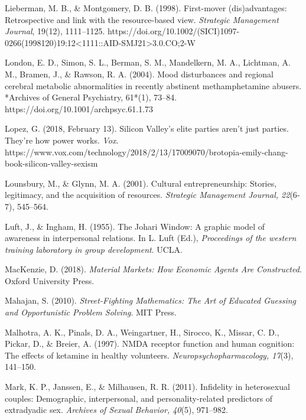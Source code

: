 \begin{thebibliography}{}
    Lieberman, M. B., \& Montgomery, D. B. (1998). First-mover (dis)advantages: Retrospective and link with the resource-based view. \textit{Strategic Management Journal}, 19(12), 1111–1125. https://doi.org/10.1002/(SICI)1097-0266(1998120)19:12<1111::AID-SMJ21>3.0.CO;2-W

    London, E. D., Simon, S. L., Berman, S. M., Mandelkern, M. A., Lichtman, A. M., Bramen, J., \& Rawson, R. A. (2004). Mood disturbances and regional cerebral metabolic abnormalities in recently abstinent methamphetamine abusers. *Archives of General Psychiatry, 61*(1), 73–84. https://doi.org/10.1001/archpsyc.61.1.73

    Lopez, G. (2018, February 13). Silicon Valley’s elite parties aren’t just parties. They’re how power works. \textit{Vox}. https://www.vox.com/technology/2018/2/13/17009070/brotopia-emily-chang-book-silicon-valley-sexism

    Lounsbury, M., \& Glynn, M. A. (2001). Cultural entrepreneurship: Stories, legitimacy, and the acquisition of resources. \textit{Strategic Management Journal, 22}(6‐7), 545–564.

    Luft, J., \& Ingham, H. (1955). The Johari Window: A graphic model of awareness in interpersonal relations. In L. Luft (Ed.), \textit{Proceedings of the western training laboratory in group development}. UCLA.


    MacKenzie, D. (2018). \textit{Material Markets: How Economic Agents Are Constructed}. Oxford University Press.

    Mahajan, S. (2010). \textit{Street-Fighting Mathematics: The Art of Educated Guessing and Opportunistic Problem Solving}. MIT Press.

    Malhotra, A. K., Pinals, D. A., Weingartner, H., Sirocco, K., Missar, C. D., Pickar, D., \& Breier, A. (1997). NMDA receptor function and human cognition: The effects of ketamine in healthy volunteers. \textit{Neuropsychopharmacology, 17}(3), 141–150.

    Mark, K. P., Janssen, E., \& Milhausen, R. R. (2011). Infidelity in heterosexual couples: Demographic, interpersonal, and personality-related predictors of extradyadic sex. \textit{Archives of Sexual Behavior, 40}(5), 971–982.


\end{thebibliography}
